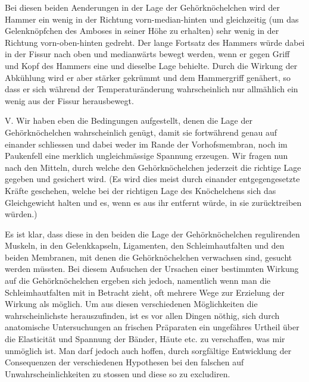 \documentclass[12pt,a4paper]{article}
\begin{document}
Bei diesen beiden Aenderungen in der Lage der Geh\"orkn\"ochelchen wird der Hammer ein wenig in der Richtung vorn-median-hinten und gleichzeitig (um das Gelenkn\"opfchen des Amboses in seiner H\"ohe zu erhalten) sehr wenig in der Richtung vorn-oben-hinten gedreht. Der lange Fortsatz des Hammers w\"urde dabei in der Fissur nach oben und medianw\"arts bewegt werden, wenn er gegen Griff und Kopf des Hammers eine und dieselbe Lage behielte. Durch die Wirkung der Abk\"uhlung wird er aber st\"arker gekr\"ummt und dem Hammergriff gen\"ahert, so dass er sich w\"ahrend der Temperatur\"anderung wahrscheinlich nur allm\"ahlich ein wenig aus der Fissur herausbewegt.

V. Wir haben eben die Bedingungen aufgestellt, denen die Lage der Geh\"orkn\"ochelchen wahrscheinlich gen\"ugt, damit sie fortw\"ahrend genau auf einander schliessen und dabei weder im Rande der Vorhofsmembran, noch im Paukenfell eine merklich ungleichm\"assige Spannung erzeugen. Wir fragen nun nach den Mitteln, durch welche den Geh\"orkn\"ochelchen jederzeit die richtige Lage gegeben und gesichert wird. (Es wird dies meist durch einander entgegengesetzte Kr\"afte geschehen, welche bei der richtigen Lage des Kn\"ochelchens sich das Gleichgewicht halten und es, wenn es aus ihr entfernt w\"urde, in sie zur\"ucktreiben w\"urden.)

Es ist klar, dass diese in den beiden die Lage der Geh\"orkn\"ochelchen regulirenden Muskeln, in den Gelenkkapseln, Ligamenten, den Schleimhautfalten und den beiden Membranen, mit denen die Geh\"orkn\"ochelchen verwachsen sind, gesucht werden m\"ussten. Bei diesem Aufsuchen der Ursachen einer bestimmten Wirkung auf die Geh\"orkn\"ochelchen ergeben sich jedoch, namentlich wenn man die Schleimhautfalten mit in Betracht zieht, oft mehrere Wege zur Erzielung der Wirkung als m\"oglich. Um aus diesen verschiedenen M\"oglichkeiten die wahrscheinlichste herauszufinden, ist es vor allen Dingen n\"othig, sich durch anatomische Untersuchungen an frischen Pr\"aparaten ein ungef\"ahres Urtheil \"uber die Elasticit\"at und Spannung der B\"ander, H\"aute etc. zu verschaffen, was mir unm\"oglich ist. Man darf jedoch auch hoffen, durch sorgf\"altige Entwicklung der Consequenzen der verschiedenen Hypothesen bei den falschen auf Unwahrscheinlichkeiten zu stossen und diese so zu excludiren.
\end{document}
